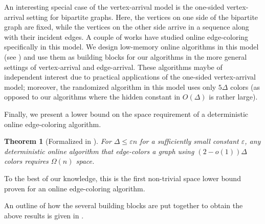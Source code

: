 \documentclass[10pt]{article}
\newtheorem{theorem}{Theorem}[section]
\theoremstyle{definition}\newtheorem{definition}[lemma]{Definition}
\theoremstyle{remark}  \newtheorem*{remark}{Remark}
\newcommand{\eps}{\varepsilon}
\begin{document}
An interesting special case of the vertex-arrival model is the one-sided vertex-arrival setting for bipartite graphs. Here, the vertices on one side of the bipartite graph are fixed, while the vertices on the other side arrive in a sequence along with their incident edges. A couple of works \cite{CohenPW19, NaorSW23} have studied online edge-coloring specifically in this model. We design low-memory online algorithms in this model (see ) and use them as building blocks for our algorithms in the more general settings of vertex-arrival and edge-arrival. These algorithms maybe of independent interest due to practical applications of the one-sided vertex-arrival model; moreover, the randomized algorithm in this model uses only $5\Delta$ colors (as opposed to our algorithms where the hidden constant in $O(\Delta)$ is rather large).  














Finally, we present a lower bound on the space requirement of a deterministic online edge-coloring algorithm. 


\begin{theorem}[Formalized in ]\label{thm:det-online-va-lb}
  For $\Delta\leq \eps n$ for a sufficiently small constant $\eps$, any deterministic online algorithm that edge-colors a graph using $(2-o(1))\Delta$ colors requires $\Omega(n)$ space. 
\end{theorem}

To the best of our knowledge, this is the first non-trivial space lower bound proven for an online edge-coloring algorithm.  




An outline of how the several building blocks are put together to obtain the above results is given in
.
\end{document}
